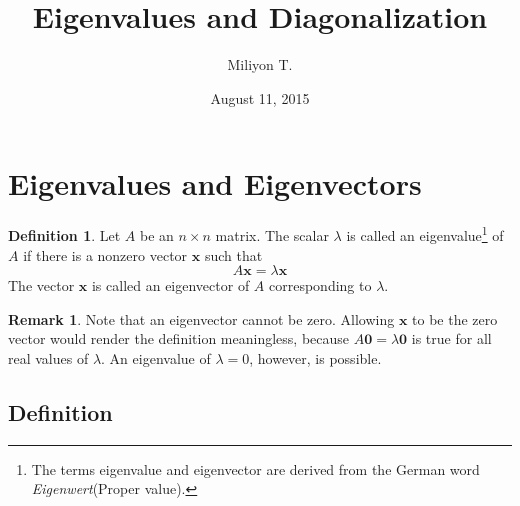 \documentclass[12pt]{article}
\theoremstyle{definition}
\newtheorem{defn}{Definition}
\newtheorem*{rmk}{Remark}
\begin{document}
\nocite{}

\title{\textbf{Eigenvalues and Diagonalization}}

\author{Miliyon T.}
\date{August 11, 2015}
\maketitle


\section*{Eigenvalues and Eigenvectors}

\begin{defn}
Let $A$ be an $n\times n$ matrix. The scalar $\lambda$ is called an eigenvalue\footnote{The terms eigenvalue and eigenvector are derived from the German word \textit{Eigenwert}(Proper value).} of $A$ if there is a nonzero vector $\mathbf{x}$ such that
\[A\mathbf{x}=\lambda \mathbf{x}\]
The vector $\mathbf{x}$ is called an eigenvector of $A$ corresponding to $\lambda$.
\end{defn}

\begin{rmk}
Note that an eigenvector cannot be zero. Allowing $\mathbf{x}$ to be the zero vector would render the definition meaningless, because $A\mathbf{0}=\lambda \mathbf{0}$ is true for all real values of $\lambda$.
An eigenvalue of $\lambda =0$, however, is possible.
\end{rmk}
\subsection*{Definition}
\end{document}
